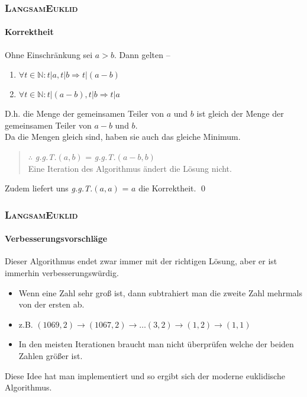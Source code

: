 \documentclass[•]{beamer}
\begin{document}
\begin{frame}
	\frametitle{\textsc{LangsamEuklid}}
	\framesubtitle{Korrektheit}
	Ohne Einschr\"ankung sei $a>b$. Dann gelten --
	\begin{enumerate}
		\item $\forall t \in \mathbb{N}:t|a , t|b \Rightarrow t|(a-b)$
		\item $\forall t \in \mathbb{N}:t|(a-b) , t|b \Rightarrow t|a$
	\end{enumerate}
	D.h. die Menge der gemeinsamen Teiler von $a$ und $b$ ist gleich der Menge der gemeinsamen Teiler von $a-b$ und $b$. \\Da die Mengen gleich sind, haben sie auch das gleiche Minimum.\\\begin{quote}
	$\therefore$ \textit{g.g.T.}$(a,b)$ = \textit{g.g.T.}$(a-b,b)$\\
	Eine Iteration des Algorithmus \"andert die L\"osung nicht.
	\end{quote}
Zudem liefert uns \textit{g.g.T.}$(a,a)$ = $a$ die Korrektheit. \qed
\end{frame}
\begin{frame}
	\frametitle{\textsc{LangsamEuklid}}
	\framesubtitle{Verbesserungsvorschl\"age}
	Dieser Algorithmus endet zwar immer mit der richtigen L\"osung, aber er ist immerhin verbesserungsw\"urdig.
	\begin{itemize}
	\item Wenn eine Zahl sehr gro{\ss} ist, dann subtrahiert man die zweite Zahl mehrmals von der ersten ab.
	\item z.B. $(1069,2) \rightarrow (1067,2) \rightarrow \dots (3,2) \rightarrow (1,2) \rightarrow (1,1)$
	\item In den meisten Iterationen braucht man nicht \"uberpr\"ufen welche der beiden Zahlen gr\"o{\ss}er ist.
	\end{itemize}
	Diese Idee hat man implementiert und so ergibt sich der moderne euklidische Algorithmus.
\end{frame}
\end{document}

